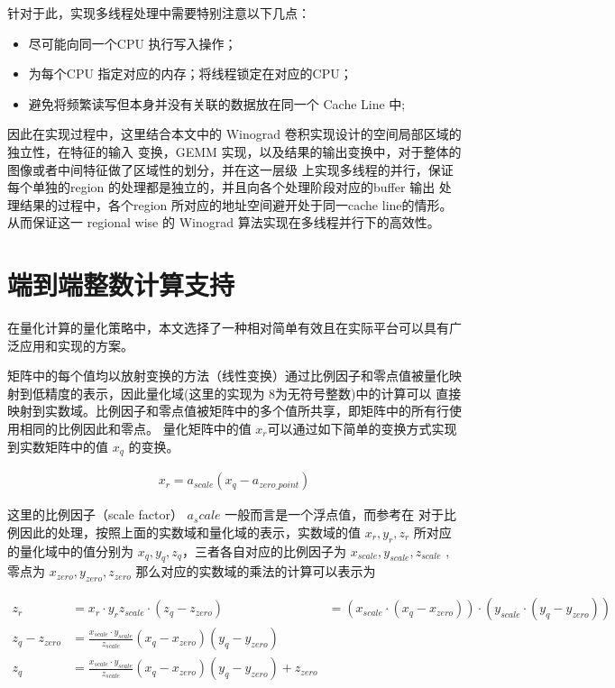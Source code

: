针对于此，实现多线程处理中需要特别注意以下几点：

\begin{itemize}
    \item 尽可能向同一个CPU 执行写入操作；
    \item 为每个CPU 指定对应的内存；将线程锁定在对应的CPU；
    \item 避免将频繁读写但本身并没有关联的数据放在同一个 Cache Line 中;
\end{itemize}

因此在实现过程中，这里结合本文中的 Winograd 卷积实现设计的空间局部区域的独立性，在特征的输入
变换，GEMM 实现，以及结果的输出变换中，对于整体的图像或者中间特征做了区域性的划分，并在这一层级
上实现多线程的并行，保证每个单独的region 的处理都是独立的，并且向各个处理阶段对应的buffer 输出
处理结果的过程中，各个region 所对应的地址空间避开处于同一cache line的情形。从而保证这一 regional wise
的 Winograd 算法实现在多线程并行下的高效性。


\section{端到端整数计算支持}

在量化计算的量化策略中，本文选择了一种相对简单有效且在实际平台可以具有广泛应用和实现的方案。

矩阵中的每个值均以放射变换的方法（线性变换）通过比例因子和零点值被量化映射到低精度的表示，因此量化域(这里的实现为
8为无符号整数)中的计算可以
直接映射到实数域。比例因子和零点值被矩阵中的多个值所共享，即矩阵中的所有行使用相同的比例因此和零点。
量化矩阵中的值 $x_r$可以通过如下简单的变换方式实现到实数矩阵中的值 $x_q$ 的变换。

\begin{align}
  x_r = a_{scale} (x_q - a_{zero\_point})
\end{align}

这里的比例因子（scale factor） $a_scale$ 一般而言是一个浮点值，而参考在 \cite{Jacob2017QuantizationAT}
对于比例因此的处理，按照上面的实数域和量化域的表示，实数域的值 $x_r, y_r, z_r$ 所对应的量化域中的值分别为
$x_q, y_q, z_q$，三者各自对应的比例因子为 $x_{scale}, y_{scale}, z_{scale}$ , 零点为 $x_{zero}, y_{zero},
 z_{zero}$
那么对应的实数域的乘法的计算可以表示为

\begin{align}
\label{eq:quan_arith}
z_r &= x_r \cdot y_r
z_{scale} \cdot (z_q - z_{zero}) &= (x_{scale} \cdot (x_q - x_{zero})) \cdot (y_{scale} \cdot (y_q - y_{zero})) \\
z_q - z_{zero} &= \frac{x_{scale}\cdot y_{scale}}{z_{scale}} (x_q - x_{zero}) (y_q - y_{zero})\\
z_q &= \frac{x_{scale}\cdot y_{scale}}{z_{scale}} (x_q - x_{zero}) (y_q - y_{zero}) + z_{zero}
\end{align}

